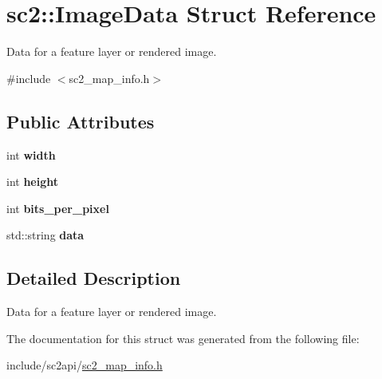 \hypertarget{structsc2_1_1_image_data}{}\section{sc2\+:\+:Image\+Data Struct Reference}
\label{structsc2_1_1_image_data}


Data for a feature layer or rendered image.  




{\ttfamily \#include $<$sc2\+\_\+map\+\_\+info.\+h$>$}

\subsection*{Public Attributes}
\begin{DoxyCompactItemize}
\item 
\mbox{\label{structsc2_1_1_image_data_a6c61d60aee146b01b74458aa79b35d69}} 
int {\bfseries width}
\item 
\mbox{\label{structsc2_1_1_image_data_af27abd93cffa10de135dc2b716b768a8}} 
int {\bfseries height}
\item 
\mbox{\label{structsc2_1_1_image_data_a7557ef40ae2f85e04da1d38ec05a7fff}} 
int {\bfseries bits\+\_\+per\+\_\+pixel}
\item 
\mbox{\label{structsc2_1_1_image_data_ac73a63c868d34eb8b46f7838e5fa72fe}} 
std\+::string {\bfseries data}
\end{DoxyCompactItemize}


\subsection{Detailed Description}
Data for a feature layer or rendered image. 

The documentation for this struct was generated from the following file\+:\begin{DoxyCompactItemize}
\item 
include/sc2api/\hyperlink{sc2__map__info_8h}{sc2\+\_\+map\+\_\+info.\+h}\end{DoxyCompactItemize}
